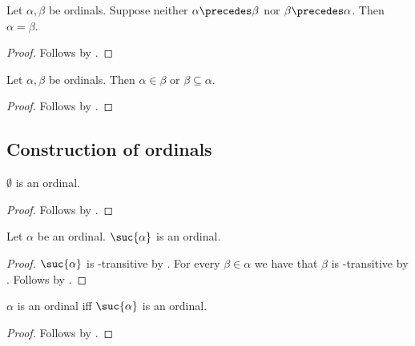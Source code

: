 \begin{corollary}\label{ordinal_prec_trichotomy}
    Let $\alpha,\beta$ be ordinals.
    Suppose neither $\alpha\precedes\beta$ nor $\beta\precedes\alpha$.
    Then $\alpha = \beta$.
\end{corollary}
\begin{proof}
    Follows by .
\end{proof}

\begin{corollary}\label{ordinal_elem_or_superset}
    Let $\alpha,\beta$ be ordinals. Then $\alpha\in \beta$ or $\beta\subseteq \alpha$.
\end{corollary}
\begin{proof}
    Follows by .
\end{proof}



\subsection{Construction of ordinals}

\begin{proposition}\label{emptyset_is_ordinal}
    $\emptyset$ is an ordinal.
\end{proposition}
\begin{proof}
    Follows by .
\end{proof}

\begin{classification}\label{suc_ordinal}
    Let $\alpha$ be an ordinal.
    $\suc{\alpha}$ is an ordinal.
\end{classification}
\begin{proof}
    $\suc{\alpha}$ is \in-transitive by .
    For every $\beta\in\alpha$ we have that $\beta$ is \in-transitive
        by .
    Follows by .
\end{proof}

\begin{proposition}\label{ordinal_iff_suc_ordinal}
    $\alpha$ is an ordinal iff $\suc{\alpha}$ is an ordinal.
\end{proposition}
\begin{proof}
    Follows by .
\end{proof}

